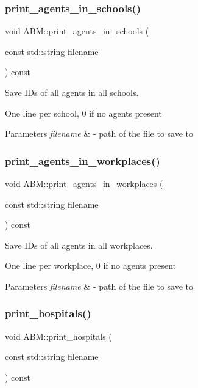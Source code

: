 \subsubsection{\texorpdfstring{print\+\_\+agents\+\_\+in\+\_\+schools()}{print\_agents\_in\_schools()}}
{\footnotesize\ttfamily void A\+B\+M\+::print\+\_\+agents\+\_\+in\+\_\+schools (\begin{DoxyParamCaption}\item[{const std\+::string}]{filename }\end{DoxyParamCaption}) const}



Save I\+Ds of all agents in all schools. 

One line per school, 0 if no agents present 
\begin{DoxyParams}{Parameters}
{\em filename} & -\/ path of the file to save to \\
\hline
\end{DoxyParams}
\mbox{\label{classABM_a60163307e6a7b6461bde10d86f6ccbca}} 
\subsubsection{\texorpdfstring{print\+\_\+agents\+\_\+in\+\_\+workplaces()}{print\_agents\_in\_workplaces()}}
{\footnotesize\ttfamily void A\+B\+M\+::print\+\_\+agents\+\_\+in\+\_\+workplaces (\begin{DoxyParamCaption}\item[{const std\+::string}]{filename }\end{DoxyParamCaption}) const}



Save I\+Ds of all agents in all workplaces. 

One line per workplace, 0 if no agents present 
\begin{DoxyParams}{Parameters}
{\em filename} & -\/ path of the file to save to \\
\hline
\end{DoxyParams}
\mbox{\label{classABM_a7ac686e0d4771009ab25cfbdc33749ea}} 
\subsubsection{\texorpdfstring{print\+\_\+hospitals()}{print\_hospitals()}}
{\footnotesize\ttfamily void A\+B\+M\+::print\+\_\+hospitals (\begin{DoxyParamCaption}\item[{const std\+::string}]{filename }\end{DoxyParamCaption}) const}



